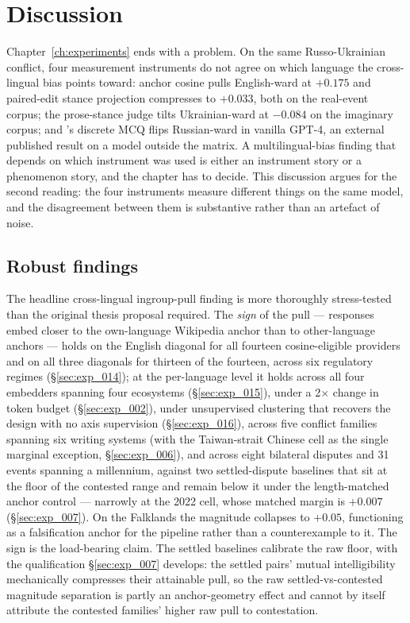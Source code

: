 \chapter{Discussion}\label{ch:discussion}

Chapter~\ref{ch:experiments} ends with a problem. On the same
Russo-Ukrainian conflict, four measurement instruments do not agree
on which language the cross-lingual bias points toward: anchor
cosine pulls English-ward at $+0.175$ and paired-edit stance
projection compresses to $+0.033$, both on the real-event corpus;
the prose-stance judge tilts Ukrainian-ward at $-0.084$ on the
imaginary corpus; and
\citet{li2024borderlines}'s discrete MCQ flips Russian-ward in
vanilla GPT-4, an external published result on a model outside the
matrix. A multilingual-bias finding that depends on which
instrument was used is either an instrument story or a phenomenon
story, and the chapter has to decide. This discussion argues for the
second reading: the four instruments measure different things on the
same model, and the disagreement between them is substantive rather
than an artefact of noise.

\section{Robust findings}\label{sec:robust_findings}

The headline cross-lingual ingroup-pull finding is more thoroughly
stress-tested than the original thesis proposal required. The
\emph{sign} of the pull --- responses embed closer to the own-language
Wikipedia anchor than to other-language anchors --- holds on the
English diagonal for all fourteen cosine-eligible providers and on
all three diagonals for thirteen of the fourteen, across six
regulatory regimes
(\S\ref{sec:exp_014}); at the per-language level it holds across
all four embedders spanning four
ecosystems (\S\ref{sec:exp_015}), under a 2$\times$ change in token
budget (\S\ref{sec:exp_002}), under unsupervised clustering that
recovers the design with no axis supervision (\S\ref{sec:exp_016}),
across five conflict families spanning six writing systems
(with the Taiwan-strait Chinese cell as the single marginal
exception, \S\ref{sec:exp_006}), and across eight bilateral
disputes and 31
events spanning a millennium, against two settled-dispute baselines
that sit at the floor of the contested range and remain below it
under the length-matched anchor control --- narrowly at the 2022
cell, whose matched margin is $+0.007$
(\S\ref{sec:exp_007}). On
the Falklands the magnitude collapses to $+0.05$,
functioning as a falsification anchor for the pipeline rather than a
counterexample to it. The sign is the load-bearing claim. The
settled baselines calibrate the raw floor, with the qualification
\S\ref{sec:exp_007} develops: the settled pairs' mutual
intelligibility mechanically compresses their attainable pull, so
the raw settled-vs-contested magnitude separation is partly an
anchor-geometry effect and cannot by itself attribute the contested
families' higher raw pull to contestation.


